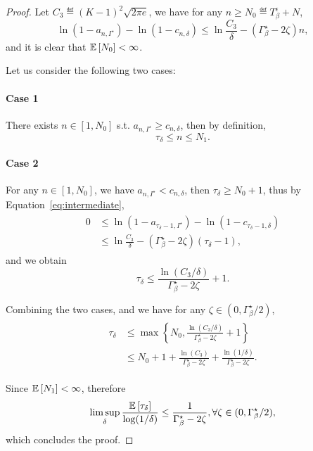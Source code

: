 \begin{proof}
    Let $C_3 \eqdef (K-1)^2\sqrt{2\pi e}$, we have for any $n \geq N_0 \eqdef T_{\beta}^\epsilon + N$,
    \begin{equation}\label{eq:intermediate}
        \ln\left(1 - a_{n,I^\star}\right) - \ln\left(1 - c_{n,\delta}\right) \leq \ln{\frac{C_3}{\delta}} - (\Gamma_{\beta}^\star-2\zeta)n,
    \end{equation}
    and it is clear that $\mathbb{E}\left[N_0\right]<\infty$.
    
    Let us consider the following two cases:
    \paragraph{Case 1}
    There exists $n\in \left[1,N_0\right]$ s.t. $a_{n,I^\star} \geq c_{n,\delta}$, then by definition,
    \[
        \tau_{\delta} \leq n \leq N_1.
    \]
    \paragraph{Case 2}
    For any $n\in \left[1,N_0\right]$, we have $a_{n,I^\star} < c_{n,\delta}$, then $\tau_{\delta} \geq N_0+1$, thus by Equation~\ref{eq:intermediate},
    \begin{align*}
    \begin{split}
        0 &\leq \ln\left(1 - a_{\tau_{\delta}-1,I^\star}\right) - \ln\left(1 - c_{\tau_{\delta}-1,\delta}\right) \\
        &\leq \ln{\frac{C_3}{\delta}} - (\Gamma_{\beta}^\star-2\zeta)(\tau_{\delta}-1),
    \end{split}
    \end{align*}
    and we obtain
    \[
        \tau_{\delta} \leq \frac{\ln(C_3/\delta)}{\Gamma_{\beta}^\star-2\zeta}+1.
    \]
    
    Combining the two cases, and we have for any $\zeta\in (0,\Gamma_{\beta}^\star/2)$,
    \begin{align*}
    \begin{split}
        \tau_{\delta} &\leq \max\left\{ N_0,\frac{\ln(C_3/\delta)}{\Gamma_{\beta}^\star-2\zeta}+1 \right\} \\
        &\leq N_0+1+\frac{\ln(C_3)}{\Gamma_{\beta}^\star-2\zeta}+\frac{\ln(1/\delta)}{\Gamma_{\beta}^\star-2\zeta}.
    \end{split}
    \end{align*}
    
    Since $\mathbb{E}\left[N_1\right]<\infty$, therefore
    \[
        \limsup_{\delta}\frac{\mathbb{E}\left[\tau_{\delta}\right]}{\log(1/\delta)} \leq \frac{1}{\Gamma_{\beta}^\star-2\zeta}, \forall\zeta\in (0,\Gamma_{\beta}^\star/2),
    \]
    which concludes the proof.
\end{proof}
